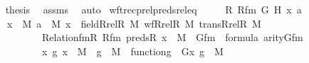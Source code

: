 \begin{isabellebody}
\ \isamarkupfalse%
\ {\isacharquery}{\kern0pt}thesis\ \isamarkupfalse%
\ assms\ \isamarkupfalse%
\ auto\isanewline
{}\isamarkupfalse%
%
\endisatagproof
{\isafoldproof}%
%
\isadelimproof
\isanewline
%
\endisadelimproof
\isanewline
{}\isamarkupfalse%
\ wftrec{\isacharunderscore}{\kern0pt}prel{\isacharunderscore}{\kern0pt}preds{\isacharunderscore}{\kern0pt}rel{\isacharunderscore}{\kern0pt}eq\ {\isacharcolon}{\kern0pt}\ \isanewline
\ \ \ R\ Rfm\ G\ H\ x\ a\isanewline
\ \ \ {\isachardoublequoteopen}x\ {\isasymin}\ M{\isachardoublequoteclose}\ {\isachardoublequoteopen}a\ {\isasymin}\ M{\isachardoublequoteclose}\ {\isachardoublequoteopen}x\ {\isasymin}\ field{\isacharparenleft}{\kern0pt}Rrel{\isacharparenleft}{\kern0pt}R{\isacharcomma}{\kern0pt}\ M{\isacharparenright}{\kern0pt}{\isacharparenright}{\kern0pt}{\isachardoublequoteclose}\ {\isachardoublequoteopen}wf{\isacharparenleft}{\kern0pt}Rrel{\isacharparenleft}{\kern0pt}R{\isacharcomma}{\kern0pt}\ M{\isacharparenright}{\kern0pt}{\isacharparenright}{\kern0pt}{\isachardoublequoteclose}\ {\isachardoublequoteopen}trans{\isacharparenleft}{\kern0pt}Rrel{\isacharparenleft}{\kern0pt}R{\isacharcomma}{\kern0pt}\ M{\isacharparenright}{\kern0pt}{\isacharparenright}{\kern0pt}{\isachardoublequoteclose}\isanewline
\ \ \ \ \ \ \ \ \ \ {\isachardoublequoteopen}Relation{\isacharunderscore}{\kern0pt}fm{\isacharparenleft}{\kern0pt}R{\isacharcomma}{\kern0pt}\ Rfm{\isacharparenright}{\kern0pt}{\isachardoublequoteclose}\ {\isachardoublequoteopen}preds{\isacharparenleft}{\kern0pt}R{\isacharcomma}{\kern0pt}\ x{\isacharparenright}{\kern0pt}\ {\isasymin}\ M{\isachardoublequoteclose}\ \ {\isachardoublequoteopen}Gfm\ {\isasymin}\ formula{\isachardoublequoteclose}\ {\isachardoublequoteopen}arity{\isacharparenleft}{\kern0pt}Gfm{\isacharparenright}{\kern0pt}\ {\isasymle}\ {}{\isachardoublequoteclose}\ \isanewline
\ \ \ \ \ \ \ \ \ \ {\isachardoublequoteopen}{\isasymAnd}x\ g{\isachardot}{\kern0pt}\ x\ {\isasymin}\ M\ {\isasymLongrightarrow}\ g\ {\isasymin}\ M\ {\isasymLongrightarrow}\ function{\isacharparenleft}{\kern0pt}g{\isacharparenright}{\kern0pt}\ {\isasymLongrightarrow}\ G{\isacharparenleft}{\kern0pt}x{\isacharcomma}{\kern0pt}\ g{\isacharparenright}{\kern0pt}\ {\isasymin}\ M{\isachardoublequoteclose}\ \isanewline

\end{isabellebody}
